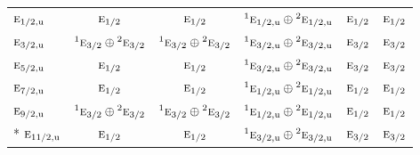 \documentclass[10pt,a4paper]{article}
\numberwithin{equation}{section}
\newcommand{\irr}[1]{\text{\normalfont\scshape #1}}
\newcommand{\conjpair}[1]{{}^{#1}}
\newcommand{\ptag}[1]{\mathrm{#1}}
\begin{document}
{\begin{longtable}{@{}lccccc@{}}
$\irr{e}_{1/2,\ptag{u}}$ & $\irr{e}_{1/2}$ & $\irr{e}_{1/2}$ & $\conjpair{1}\irr{e}_{1/2,\ptag{u}}\oplus \conjpair{2}\irr{e}_{1/2,\ptag{u}}$ & $\irr{e}_{1/2}$ & $\irr{e}_{1/2}$\\
$\irr{e}_{3/2,\ptag{u}}$ & $\conjpair{1}\irr{e}_{3/2}\oplus \conjpair{2}\irr{e}_{3/2}$ & $\conjpair{1}\irr{e}_{3/2}\oplus \conjpair{2}\irr{e}_{3/2}$ & $\conjpair{1}\irr{e}_{3/2,\ptag{u}}\oplus \conjpair{2}\irr{e}_{3/2,\ptag{u}}$ & $\irr{e}_{3/2}$ & $\irr{e}_{3/2}$\\
$\irr{e}_{5/2,\ptag{u}}$ & $\irr{e}_{1/2}$ & $\irr{e}_{1/2}$ & $\conjpair{1}\irr{e}_{3/2,\ptag{u}}\oplus \conjpair{2}\irr{e}_{3/2,\ptag{u}}$ & $\irr{e}_{3/2}$ & $\irr{e}_{3/2}$\\
$\irr{e}_{7/2,\ptag{u}}$ & $\irr{e}_{1/2}$ & $\irr{e}_{1/2}$ & $\conjpair{1}\irr{e}_{1/2,\ptag{u}}\oplus \conjpair{2}\irr{e}_{1/2,\ptag{u}}$ & $\irr{e}_{1/2}$ & $\irr{e}_{1/2}$\\
$\irr{e}_{9/2,\ptag{u}}$ & $\conjpair{1}\irr{e}_{3/2}\oplus \conjpair{2}\irr{e}_{3/2}$ & $\conjpair{1}\irr{e}_{3/2}\oplus \conjpair{2}\irr{e}_{3/2}$ & $\conjpair{1}\irr{e}_{1/2,\ptag{u}}\oplus \conjpair{2}\irr{e}_{1/2,\ptag{u}}$ & $\irr{e}_{1/2}$ & $\irr{e}_{1/2}$\\*
$\irr{e}_{11/2,\ptag{u}}$ & $\irr{e}_{1/2}$ & $\irr{e}_{1/2}$ & $\conjpair{1}\irr{e}_{3/2,\ptag{u}}\oplus \conjpair{2}\irr{e}_{3/2,\ptag{u}}$ & $\irr{e}_{3/2}$ & $\irr{e}_{3/2}$\\
\bottomrule\end{longtable}}
\end{document}
